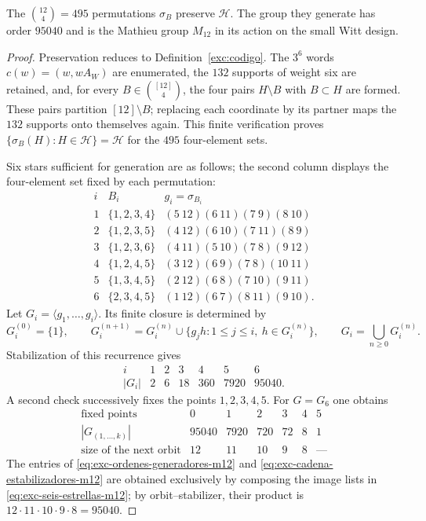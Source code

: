 \begin{proposition}
\label{exc:m12}
The $\binom{12}4=495$ permutations $\sigma_B$ preserve $\mathcal H$.
The group they generate has order $95040$ and is the Mathieu group
$M_{12}$ in its action on the small Witt design.
\end{proposition}

\begin{proof}
Preservation reduces to Definition~\ref{exc:codigo}. The
$3^6$ words $c(w)=(w,wA_W)$ are enumerated, the $132$ supports of weight six
are retained, and, for every $B\in\binom{[12]}4$, the four pairs
$H\setminus B$ with $B\subset H$ are formed. These pairs partition
$[12]\setminus B$; replacing each coordinate by its partner maps
the $132$ supports onto themselves again. This finite verification proves
\(\{\sigma_B(H):H\in\mathcal H\}=\mathcal H\) for the $495$ four-element sets.

Six stars sufficient for generation are as follows; the
second column displays the four-element set fixed by each permutation:
\[
\begin{array}{c|c|l}
i&B_i&g_i=\sigma_{B_i}\\ \hline
1&\{1,2,3,4\}&(5\ 12)(6\ 11)(7\ 9)(8\ 10)\\
2&\{1,2,3,5\}&(4\ 12)(6\ 10)(7\ 11)(8\ 9)\\
3&\{1,2,3,6\}&(4\ 11)(5\ 10)(7\ 8)(9\ 12)\\
4&\{1,2,4,5\}&(3\ 12)(6\ 9)(7\ 8)(10\ 11)\\
5&\{1,3,4,5\}&(2\ 12)(6\ 8)(7\ 10)(9\ 11)\\
6&\{2,3,4,5\}&(1\ 12)(6\ 7)(8\ 11)(9\ 10).
\end{array}
\tag{M12.1}
\label{eq:exc-seis-estrellas-m12}
\]
Let $G_i=\langle g_1,\ldots,g_i\rangle$. Its finite closure is
determined by
\[
 G_i^{(0)}=\{1\},\qquad
 G_i^{(n+1)}=G_i^{(n)}\cup
 \{g_jh:1\leq j\leq i,\ h\in G_i^{(n)}\},\qquad
 G_i=\bigcup_{n\geq0}G_i^{(n)}.
\tag{M12.2}
\label{eq:exc-clausura-finita-m12}
\]
Stabilization of this recurrence gives
\[
\begin{array}{c|rrrrrr}
i&1&2&3&4&5&6\\ \hline
|G_i|&2&6&18&360&7920&95040.
\end{array}
\tag{M12.3}
\label{eq:exc-ordenes-generadores-m12}
\]
A second check successively fixes the points $1,2,3,4,5$. For
$G=G_6$ one obtains
\[
\begin{array}{c|rrrrrr}
\text{fixed points}&0&1&2&3&4&5\\ \hline
|G_{(1,\ldots,k)}|&95040&7920&720&72&8&1\\
\text{size of the next orbit}&12&11&10&9&8&\text{---}
\end{array}
\tag{M12.4}
\label{eq:exc-cadena-estabilizadores-m12}
\]
The entries of \eqref{eq:exc-ordenes-generadores-m12} and
\eqref{eq:exc-cadena-estabilizadores-m12} are obtained exclusively by
composing the image lists in
\eqref{eq:exc-seis-estrellas-m12}; by orbit--stabilizer, their product
is $12\cdot11\cdot10\cdot9\cdot8=95040$.


\end{proof}
